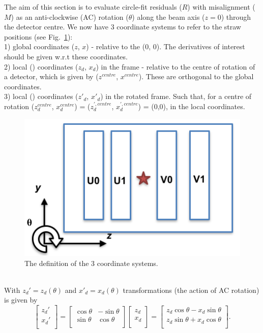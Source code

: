 \documentclass[a4paper,11pt]{article}
\begin{document}
The aim of this section is to evaluate circle-fit residuals ($R$) with misalignment ($M$) as an anti-clockwise (AC) rotation ($\theta$) along the beam axis ($z=0$) through the detector centre. We now have 3 coordinate systems to refer to the straw positions (see Fig.~\ref{fig:theta}): \\
1) global coordinates ($z$, $x$) - relative to the  (0, 0). The derivatives of interest should be given w.r.t these coordinates. \\ 
2) local () coordinates ($z_d$, $x_d$) in the  frame - relative to the centre of rotation of a detector, which is given by ($z^{centre}$, $x^{centre}$). These are orthogonal to the global coordinates. \\ 
3) local () coordinates ($z'_{d}$, $x'_d$) in the rotated frame. Such that, for a centre of rotation ($z^{centre}_d$, $x^{centre}_d$) = ($z^{',centre}_{d}$, $x^{',centre}_d$) = (0,0), in the local coordinates.
\begin{figure}[!ht]
\centering
\includegraphics[width=0.9\linewidth]{fig/theta.png}
\caption{The definition of the 3 coordinate systems.}
\label{fig:theta}
\end{figure}\\
With $z_d'=z_d(\theta)$ and $x'_d=x_d(\theta)$ transformations (the action of AC rotation) is given by
\begin{equation}
\begin{bmatrix}z_d'\\x_d'\\\end{bmatrix}=\begin{bmatrix}\cos \theta &-\sin \theta \\\sin \theta &\cos \theta \\\end{bmatrix} \begin{bmatrix}z_d\\x_d\\\end{bmatrix} = \begin{bmatrix}z_d\cos \theta -x_d\sin \theta \\z_d\sin \theta +x_d\cos \theta \\\end{bmatrix}.
\end{equation}
\end{document}
